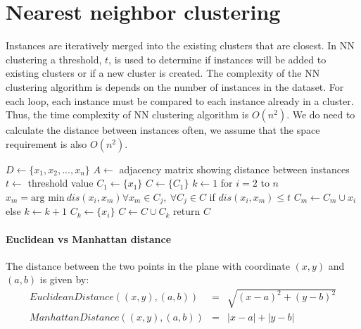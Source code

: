 \section{Nearest neighbor clustering}
Instances are iteratively merged into the existing clusters that are closest. In NN clustering a threshold, $t$, is used to determine if instances will be added to existing clusters or if a new cluster is created. The complexity of the NN clustering algorithm is depends on the number of instances in the dataset. For each loop, each instance must be compared to each instance already in a cluster. Thus, the time complexity of NN clustering algorithm is $O(n^2)$. We do need to calculate the distance between instances often, we assume that the space requirement is also $O(n^2)$.
\begin{algorithm}[caption={Nearest-neighbor clustering.}, label={alg14}]
$D \leftarrow \{ x_1, x_2, ..., x_n \}$
$A \leftarrow$ adjacency matrix showing distance between instances
$t \leftarrow$ threshold value
$C_1 \leftarrow \{x_1\}$
$C \leftarrow \{C_1\}$
$k \leftarrow 1$
for $i = 2$ to $n$
    $x_m = \text{arg min}~dis(x_i, x_m) \forall x_m \in C_j, ~\forall C_j \in C$
    if $dis(x_i, x_m) \leq t$
        $C_m \leftarrow C_m \cup x_i$
    else
        $k \leftarrow k + 1$
        $C_k \leftarrow \{ x_i \}$
        $C \leftarrow C \cup C_k$
return $C$
\end{algorithm}

\paragraph{Euclidean vs Manhattan distance} The distance between the two points in the plane with coordinate $(x,y)$ and $(a,b)$ is given by:
\begin{eqnarray*}
    EuclideanDistance((x,y), (a,b)) &=& \sqrt{(x-a)^2 + (y-b)^2} \\
    ManhattanDistance((x,y),(a,b)) &=& |x-a| + |y-b|
\end{eqnarray*}


